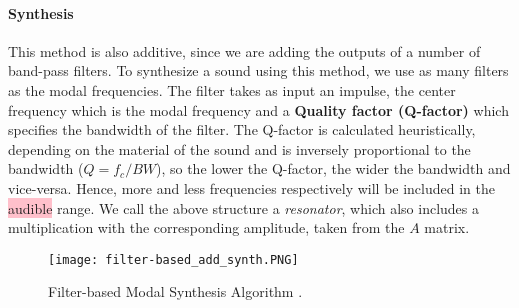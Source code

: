 \paragraph{Synthesis\\}\label{par:synth}

This method is also additive, since we are adding the outputs of a number of band-pass filters. To synthesize a sound using this method, we use as many filters as the modal frequencies. The filter takes as input an impulse, the center frequency which is the modal frequency and a \textbf{Quality factor (Q-factor)} which specifies the bandwidth of the filter. The Q-factor is calculated heuristically, depending on the material of the sound and is inversely proportional to the bandwidth ($Q=f_c/BW$), so the lower the Q-factor, the wider the bandwidth and vice-versa. Hence, more and less frequencies respectively will be included in the \colorbox{pink}{audible} range. We call the above structure a \textit{resonator}, which also includes a multiplication with the corresponding amplitude, taken from the $A$ matrix.

\begin{figure}[H]
  \centering
    \texttt{[image: filter-based\_add\_synth.PNG]}
      \caption{Filter-based Modal Synthesis Algorithm \cite{Cook:2002:RSS:515316}.}
      \label{fig:filter_synth}
\end{figure}

